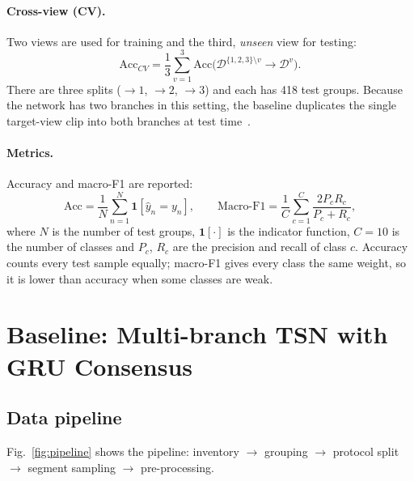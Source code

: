 \documentclass[runningheads]{llncs}
\begin{document}
\paragraph{Cross-view (CV).} Two views are used for training and the third, \emph{unseen} view for testing:
\begin{equation}
\mathrm{Acc}_{CV}=\frac{1}{3}\sum_{v=1}^{3}\mathrm{Acc}\big(\mathcal{D}^{\{1,2,3\}\setminus v}\rightarrow\mathcal{D}^{v}\big).
\end{equation}
There are three splits ($\rightarrow1$, $\rightarrow2$, $\rightarrow3$) and each has 418 test groups. Because the network has two branches in this setting, the baseline duplicates the single target-view clip into both branches at test time~\cite{bui2020}.

\paragraph{Metrics.} Accuracy and macro-F1 are reported:
\begin{equation}
\mathrm{Acc}=\frac{1}{N}\sum_{n=1}^{N}\mathbf{1}[\hat y_n=y_n],\qquad
\text{Macro-F1}=\frac{1}{C}\sum_{c=1}^{C}\frac{2P_cR_c}{P_c+R_c},
\end{equation}
where $N$ is the number of test groups, $\mathbf 1[\cdot]$ is the indicator function, $C=10$ is the number of classes and $P_c$, $R_c$ are the precision and recall of class $c$. Accuracy counts every test sample equally; macro-F1 gives every class the same weight, so it is lower than accuracy when some classes are weak.

\section{Baseline: Multi-branch TSN with GRU Consensus}
\subsection{Data pipeline}
Fig.~\ref{fig:pipeline} shows the pipeline: inventory $\rightarrow$ grouping $\rightarrow$ protocol split $\rightarrow$ segment sampling $\rightarrow$ pre-processing.
\end{document}
